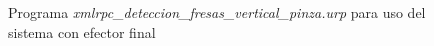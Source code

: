    \begin{figure}[H]
      \begin{center}
        \subcapcentertrue
        \hspace{1mm}
      \end{center}
      \caption{Programa \textit{xmlrpc\_deteccion\_fresas\_vertical\_pinza.urp} para uso del sistema con efector final}
      \label{fig:Programa_UR_pinza}
   \end{figure}
   
